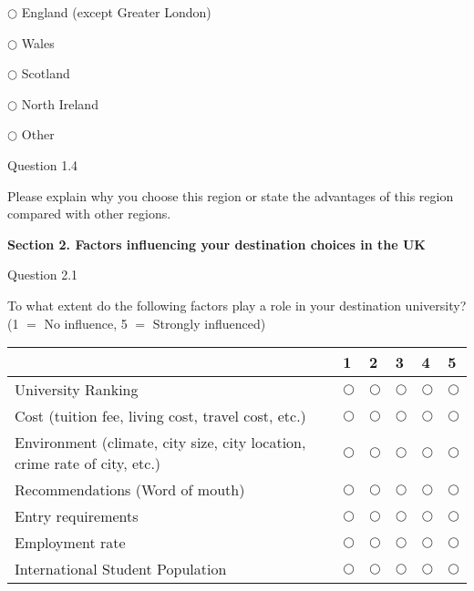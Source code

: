 $\bigcirc $ England (except Greater London)

$\bigcirc $ Wales

$\bigcirc $ Scotland

$\bigcirc $ North Ireland

$\bigcirc $ Other


Question 1.4

Please explain why you choose this region or state the advantages of this 
region compared with other regions.

\begin{center}


\textbf{Section 2. Factors influencing your destination choices in the UK}
\end{center}

Question 2.1

To what extent do the following factors play a role in your destination 
university? (1 $=$ No influence, 5 $=$ Strongly influenced)

\begin{table}[H]
\begin{center}
\begin{tabular}{|p{6cm}|p{1cm}|p{1cm}|p{1cm}|p{1cm}|p{1cm}|}
\hline
& 
1& 
2& 
3& 
4& 
5 \\
\hline
University Ranking& 
$\bigcirc $& 
$\bigcirc $& 
$\bigcirc $& 
$\bigcirc $& 
$\bigcirc $ \\
\hline
Cost (tuition fee, living cost, travel cost, etc.) & 
$\bigcirc $& 
$\bigcirc $& 
$\bigcirc $& 
$\bigcirc $& 
$\bigcirc $ \\
\hline
Environment (climate, city size, city location, crime rate of city, etc.) & 
$\bigcirc $& 
$\bigcirc $& 
$\bigcirc $& 
$\bigcirc $& 
$\bigcirc $ \\
\hline
Recommendations (Word of mouth) & 
$\bigcirc $& 
$\bigcirc $& 
$\bigcirc $& 
$\bigcirc $& 
$\bigcirc $ \\
\hline
Entry requirements & 
$\bigcirc $& 
$\bigcirc $& 
$\bigcirc $& 
$\bigcirc $& 
$\bigcirc $ \\
\hline
Employment rate & 
$\bigcirc $& 
$\bigcirc $& 
$\bigcirc $& 
$\bigcirc $& 
$\bigcirc $ \\
\hline
International Student Population & 
$\bigcirc $& 
$\bigcirc $& 
$\bigcirc $& 
$\bigcirc $& 
$\bigcirc $ \\
\hline
\end{tabular}
\label{tab1}
\end{center}
\end{table}


